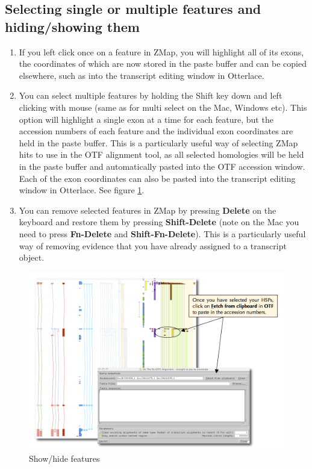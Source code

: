 \documentclass[letterpaper]{article}
\begin{document}
\subsection{Selecting single or multiple features and hiding/showing them}
\begin{enumerate}
\item If you left click once on a feature in ZMap, you will highlight all of its exons, the coordinates of which are now stored in the paste buffer and can be copied elsewhere, such as into the transcript editing window in Otterlace.
\item You can select multiple features by holding the Shift key down and left clicking with mouse (same as for multi select on the Mac, Windows etc). This option will highlight a single exon at a time for each feature, but the accession numbers of each feature and the individual exon coordinates are held in the paste buffer. This is a particularly useful way of selecting ZMap hits to use in the OTF alignment tool, as all selected homologies will be held in the paste buffer and automatically pasted into the OTF accession window. Each of the exon coordinates can also be pasted into the transcript editing window in Otterlace. See figure \ref{img_show_hide}.
\item You can remove selected features in ZMap by pressing \textbf{Delete} on the keyboard and restore them by pressing \textbf{Shift-Delete} (note on the Mac you need to press \textbf{Fn-Delete} and \textbf{Shift-Fn-Delete}). This is a particularly useful way of removing evidence that you have already assigned to a transcript object.
\end{enumerate}


\begin{figure}
\centering
\color[rgb]{0.30980393,0.5058824,0.7411765}
\includegraphics[width=15.231cm]{img_show_hide.png}
\caption{Show/hide features}
\label{img_show_hide}
\end{figure}
\end{document}
